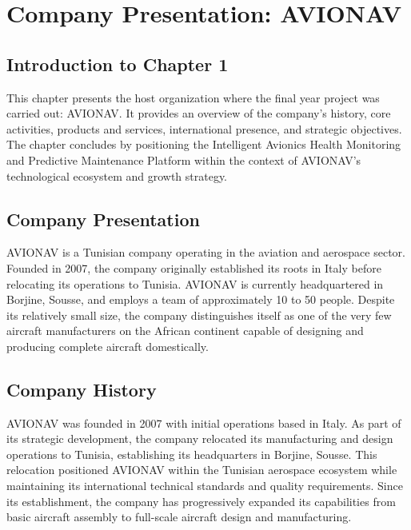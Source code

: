 \chapter{Company Presentation: AVIONAV}

\section*{Introduction to Chapter 1}

This chapter presents the host organization where the final year project was carried out: AVIONAV. It provides an overview of the company's history, core activities, products and services, international presence, and strategic objectives. The chapter concludes by positioning the Intelligent Avionics Health Monitoring and Predictive Maintenance Platform within the context of AVIONAV's technological ecosystem and growth strategy.

\section{Company Presentation}

AVIONAV is a Tunisian company operating in the aviation and aerospace sector. Founded in 2007, the company originally established its roots in Italy before relocating its operations to Tunisia. AVIONAV is currently headquartered in Borjine, Sousse, and employs a team of approximately 10 to 50 people. Despite its relatively small size, the company distinguishes itself as one of the very few aircraft manufacturers on the African continent capable of designing and producing complete aircraft domestically.

\section{Company History}

AVIONAV was founded in 2007 with initial operations based in Italy. As part of its strategic development, the company relocated its manufacturing and design operations to Tunisia, establishing its headquarters in Borjine, Sousse. This relocation positioned AVIONAV within the Tunisian aerospace ecosystem while maintaining its international technical standards and quality requirements. Since its establishment, the company has progressively expanded its capabilities from basic aircraft assembly to full-scale aircraft design and manufacturing.

